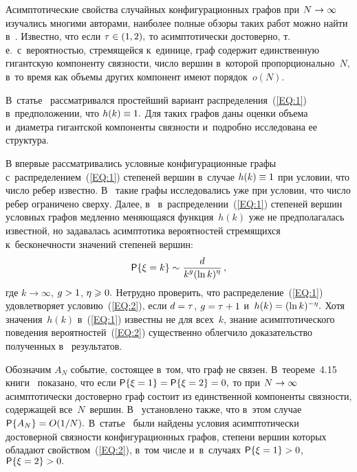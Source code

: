 \begin{multicols}{2}
Асимптотические свойства случайных конфигурационных графов при $N\hm\rightarrow \infty$ изучались 
многими авторами, наиболее полные обзоры таких работ можно найти в~\cite{Hof,Dur}. Известно, что 
если $\tau \hm\in (1, 2),$ то асимптотически достоверно, т.\,е.\ с~ве\-ро\-ят\-ностью, стремящейся к~единице, граф содержит единственную гигантскую компоненту связности, число вершин в~которой 
пропорционально~$N,$ в~то время как объемы других компонент имеют порядок~$o(N).$

В~статье~\cite{RN1} рассматривался простейший вариант распределения~(\ref{EQ:1}) 
в~предположении, что $h(k)\hm\equiv 1.$ Для таких графов даны оценки объема 
и~диа\-мет\-ра гигантской компоненты связности и~\mbox{подробно} исследована ее структура.

В \cite{PavCh} впервые рассматривались условные конфигурационные графы с~распределением~(\ref{EQ:1}) 
степеней вершин в~случае $h(k)\hm\equiv 1$ при условии, что число ребер известно. 
В~\cite{PavKh} такие графы исследовались уже при условии, что число ребер ограничено сверху. 
Далее, в~\cite{Pav} в~распределении~(\ref{EQ:1}) степеней вершин условных графов медленно меняющаяся 
функция~$h(k)$ уже не предполагалась известной, но задавалась асимптотика вероятностей 
стремящихся к~бесконечности значений степеней вершин:
\begin{equation}
\label{EQ:2}
\mathsf{P}\{\xi = k\} \sim \displaystyle\frac{\displaystyle d\mathstrut}{\displaystyle k^g (\ln k)^\eta\mathstrut}\,,
\end{equation}
где $k\rightarrow \infty$, $g\hm>1$, $\eta \hm\geqslant 0.$ Нетрудно проверить, что 
распределение~(\ref{EQ:1}) удовлетворяет условию~(\ref{EQ:2}), если $d\hm=\tau$, 
$g\hm=\tau \hm+1$ и~$h(k)\hm=(\ln k)^{-\eta}.$
Хотя значения~$h(k)$ в~(\ref{EQ:1}) известны не для всех~$k$, знание асимптотического поведения 
вероятностей~(\ref{EQ:2}) существенно облегчило  доказательство полученных в~\cite{Pav} результатов.

Обозначим $A_N$ событие, состоящее в~том, что граф не связен.
В~теореме~4.15 книги~\cite{Hof2} показано, что если $\mathsf{P}\{\xi \hm= 1\} \hm= \mathsf{P}\{\xi\hm = 2\}
\hm =0,$ то при $N\hm\rightarrow \infty$ асимптотически достоверно граф состоит из 
единственной компоненты связности, содержащей все~$N$~вершин. 
В~\cite{Hof2} установлено также, что в~этом случае 
$\mathsf{P}\{A_N\}\hm=O(1/N).$ В~статье~\cite{Pav2} были найдены условия асимптотически достоверной 
связ\-ности конфигурационных графов, степени вершин которых обладают свойством~(\ref{EQ:2}), в~том числе 
и~в~случаях $\mathsf{P}\{\xi \hm= 1\}\hm>0$, $\mathsf{P}\{\xi \hm= 2\}>0.$


\end{multicols}
